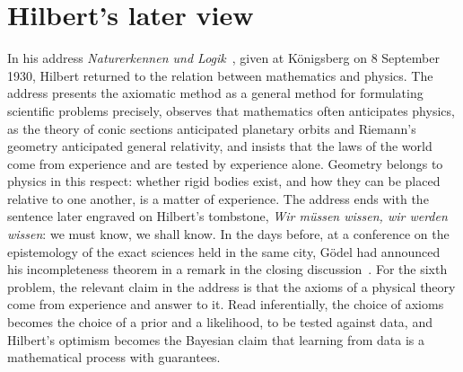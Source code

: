 \section{Hilbert's later view}

In his address \emph{Naturerkennen und Logik}~\cite{hilbert1930}, given at K\"onigsberg on 8 September 1930, Hilbert returned to the relation between mathematics and physics. The address presents the axiomatic method as a general method for formulating scientific problems precisely, observes that mathematics often anticipates physics, as the theory of conic sections anticipated planetary orbits and Riemann's geometry anticipated general relativity, and insists that the laws of the world come from experience and are tested by experience alone. Geometry belongs to physics in this respect: whether rigid bodies exist, and how they can be placed relative to one another, is a matter of experience. The address ends with the sentence later engraved on Hilbert's tombstone, \emph{Wir m\"ussen wissen, wir werden wissen}: we must know, we shall know. In the days before, at a conference on the epistemology of the exact sciences held in the same city, G\"odel had announced his incompleteness theorem in a remark in the closing discussion~\cite{goedel1931b}. For the sixth problem, the relevant claim in the address is that the axioms of a physical theory come from experience and answer to it. Read inferentially, the choice of axioms becomes the choice of a prior and a likelihood, to be tested against data, and Hilbert's optimism becomes the Bayesian claim that learning from data is a mathematical process with guarantees.
